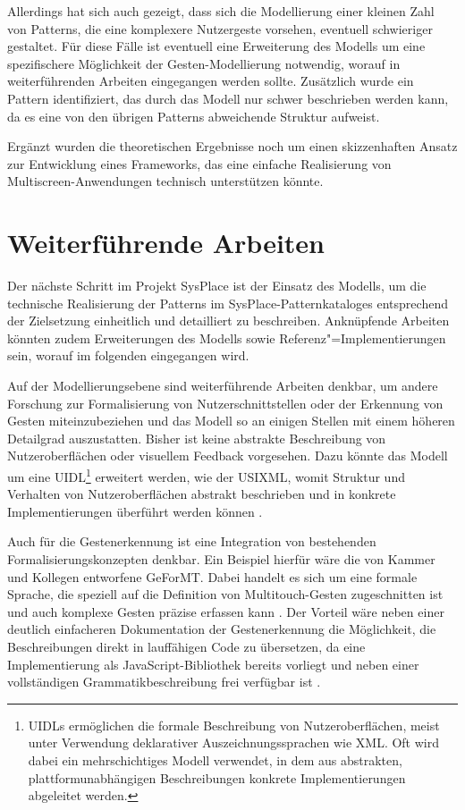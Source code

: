 Allerdings hat sich auch gezeigt, dass sich die Modellierung einer kleinen Zahl von Patterns, die eine komplexere Nutzergeste vorsehen, eventuell schwieriger gestaltet. Für diese Fälle ist eventuell eine Erweiterung des Modells um eine spezifischere Möglichkeit der Gesten-Modellierung notwendig, worauf in weiterführenden Arbeiten eingegangen werden sollte. Zusätzlich wurde ein Pattern identifiziert, das durch das Modell nur schwer beschrieben werden kann, da es eine von den übrigen Patterns abweichende Struktur aufweist. 

Ergänzt wurden die theoretischen Ergebnisse noch um einen skizzenhaften Ansatz zur Entwicklung eines Frameworks, das eine einfache Realisierung von Multiscreen-Anwendungen technisch unterstützen könnte.

\section{Weiterführende Arbeiten}
Der nächste Schritt im Projekt SysPlace ist der Einsatz des Modells, um die technische Realisierung der Patterns im SysPlace-Patternkataloges entsprechend der Zielsetzung einheitlich und detailliert zu beschreiben. Anknüpfende Arbeiten könnten zudem Erweiterungen des Modells sowie Referenz"=Implementierungen sein, worauf im folgenden eingegangen wird.

Auf der Modellierungsebene sind weiterführende Arbeiten denkbar, um andere Forschung zur Formalisierung von Nutzerschnittstellen oder der Erkennung von Gesten miteinzubeziehen und das Modell so an einigen Stellen mit einem höheren Detailgrad auszustatten. Bisher ist keine abstrakte Beschreibung von Nut\-zer\-o\-ber\-flä\-chen oder visuellem Feedback vorgesehen. Dazu könnte das Modell um eine \acs{UIDL}\footnote{\acp{UIDL} ermöglichen die formale Beschreibung von Nutzeroberflächen, meist unter Verwendung deklarativer Auszeichnungssprachen wie \zb \acs{XML}. Oft wird dabei ein mehrschichtiges Modell verwendet, in dem aus abstrakten, plattformunabhängigen Beschreibungen konkrete Implementierungen abgeleitet werden.} erweitert werden, wie \zb der \ac{USIXML}, womit Struktur und Verhalten von Nutzeroberflächen abstrakt beschrieben und in konkrete Implementierungen überführt werden können \citep{Limbourg04}.

Auch für die Gestenerkennung ist eine Integration von bestehenden Formalisierungskonzepten denkbar. Ein Beispiel hierfür wäre die von Kammer und Kollegen entworfene \ac{GeForMT}. Dabei handelt es sich um eine formale Sprache, die speziell auf die Definition von Multitouch-Gesten zugeschnitten ist und auch komplexe Gesten präzise erfassen kann \citep{Kammer2010}. Der Vorteil wäre neben einer deutlich einfacheren Dokumentation der Gestenerkennung die Möglichkeit, die Beschreibungen direkt in lauffähigen Code zu übersetzen, da eine Implementierung als JavaScript-Bibliothek bereits vorliegt und neben einer vollständigen Grammatikbeschreibung frei verfügbar ist \citep{Kammer2013}.

